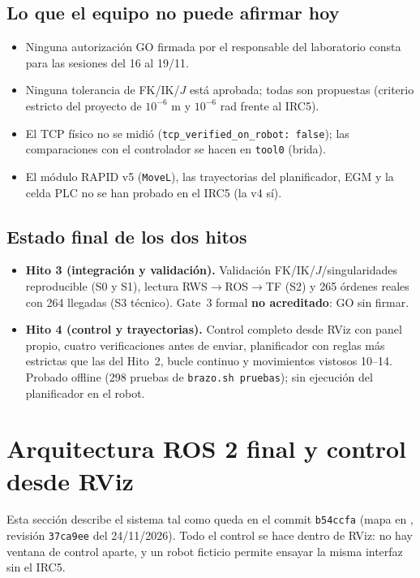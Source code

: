 \documentclass[10pt,a4paper]{article}
\DeclareRobustCommand{\ruta}[1]{\path{#1}}
\begin{document}
\subsection{Lo que el equipo no puede afirmar hoy}
\begin{itemize}
\item Ninguna autorización GO firmada por el responsable del laboratorio consta para las sesiones del 16 al 19/11.
\item Ninguna tolerancia de FK/IK/$J$ está aprobada; todas son propuestas (criterio estricto del proyecto de $10^{-6}$ m y $10^{-6}$ rad frente al IRC5).
\item El TCP físico no se midió (\texttt{tcp\_verified\_on\_robot: false}); las comparaciones con el controlador se hacen en \texttt{tool0} (brida).
\item El módulo RAPID v5 (\texttt{MoveL}), las trayectorias del planificador, EGM y la celda PLC no se han probado en el IRC5 (la v4 sí).
\end{itemize}


\subsection{Estado final de los dos hitos}
\begin{itemize}[leftmargin=*]
\item \textbf{Hito 3 (integración y validación).} Validación FK/IK/$J$/singularidades reproducible (S0 y S1), lectura RWS$\to$ROS$\to$TF (S2) y 265 órdenes reales con 264 llegadas (S3 técnico). Gate~3 formal \textbf{no acreditado}: GO sin firmar.
\item \textbf{Hito 4 (control y trayectorias).} Control completo desde RViz con panel propio, cuatro verificaciones antes de enviar, planificador con reglas más estrictas que las del Hito~2, bucle continuo y movimientos vistosos 10--14. Probado offline (298 pruebas de \texttt{brazo.sh pruebas}); sin ejecución del planificador en el robot.
\end{itemize}
\section{Arquitectura ROS 2 final y control desde RViz}
\label{sec:ros2}

Esta sección describe el sistema tal como queda en el commit \texttt{b54ccfa} (mapa en \ruta{docs/MAPA_ROS2.md}, revisión \texttt{37ca9ee} del 24/11/2026). Todo el control se hace dentro de RViz: no hay ventana de control aparte, y un robot ficticio permite ensayar la misma interfaz sin el IRC5.
\end{document}
